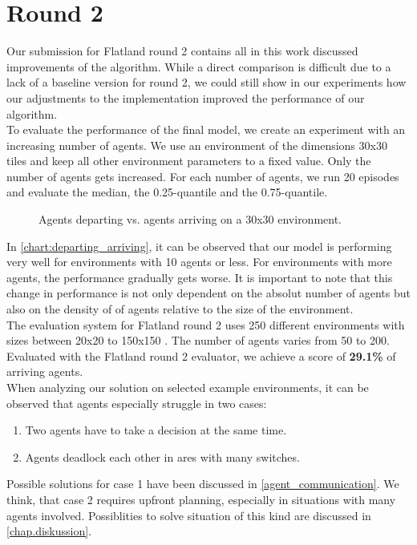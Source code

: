\section{Round 2}
Our submission for Flatland round 2 contains all in this work discussed improvements of the algorithm. While a direct comparison is difficult due to a lack of a baseline version for round 2, we could still show in our experiments how our adjustments to the implementation improved the performance of our algorithm.\\
To evaluate the performance of the final model, we create an experiment with an increasing number of agents. We use an environment of the dimensions 30x30 tiles and keep all other environment parameters to a fixed value. Only the number of agents gets increased. For each number of agents, we run 20 episodes and evaluate the median, the 0.25-quantile and the 0.75-quantile.
\begin{figure}[H]
	\begin{center}
		
	\end{center}
	\caption{Agents departing vs. agents arriving on a 30x30 environment.}
	\label{chart:departing_arriving}
\end{figure}
In \autoref{chart:departing_arriving}, it can be observed that our model is performing very well for environments with 10 agents or less. For environments with more agents, the performance gradually gets worse. It is important to note that this change in performance is not only dependent on the absolut number of agents but also on the density of of agents relative to the size of the environment.\\
The evaluation system for Flatland round 2 uses 250 different environments with sizes between 20x20 to 150x150 \cite{flatland_faq}. The number of agents varies from 50 to 200.
Evaluated with the Flatland round 2 evaluator, we achieve a score of \textbf{29.1\%} of arriving agents.\\
When analyzing our solution on selected example environments, it can be observed that agents especially struggle in two cases:
\begin{enumerate}
	\item Two agents have to take a decision at the same time.
	\item Agents deadlock each other in ares with many switches.
\end{enumerate}
Possible solutions for case 1 have been discussed in \autoref{agent_communication}. We think, that case 2 requires upfront planning, especially in situations with many agents involved. Possiblities to solve situation of this kind are discussed in \autoref{chap.diskussion}.








